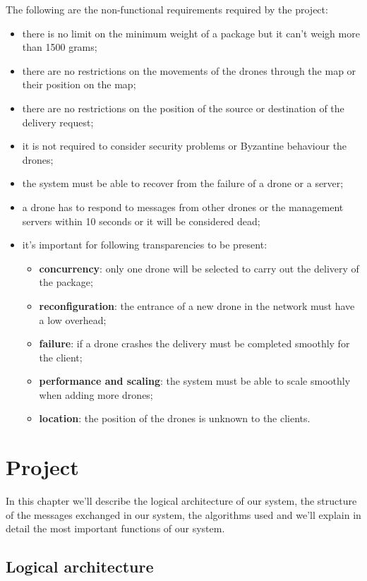 \documentclass[a4paper, oneside]{memoir}
\begin{document}
The following are the non-functional requirements required by the project:
\begin{itemize}
\item there is no limit on the minimum weight of a package but it can't weigh more than 1500 grams;
\item there are no restrictions on the movements of the drones through the map or their position on the map;
\item there are no restrictions on the position of the source or destination of the delivery request;
\item it is not required to consider security problems or Byzantine behaviour the drones;
\item the system must be able to recover from the failure of a drone or a server;
\item a drone has to respond to messages from other drones or the management servers within 10 seconds or it will be considered dead;
\item it's important for following transparencies to be present:
	\begin{itemize}
	\item \textbf{concurrency}: only one drone will be selected to carry out the delivery of the package;
	\item \textbf{reconfiguration}: the entrance of a new drone in the network must have a low overhead;
	\item \textbf{failure}: if a drone crashes the delivery must be completed smoothly for the client;
	\item \textbf{performance and scaling}: the system must be able to scale smoothly when adding more drones;
	\item \textbf{location}: the position of the drones is unknown to the clients.
	\end{itemize}
\end{itemize}


\chapter{Project}
In this chapter we'll describe the logical architecture of our system, the structure of the messages exchanged in our system, the algorithms used and we'll explain in detail the most important functions of our system.

\section{Logical architecture}
\end{document}
